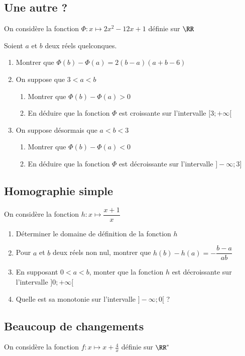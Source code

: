 \documentclass[oneside,12pt]{article}          %
\begin{document}
\subsection{Une autre ?}
On considère la fonction $\Phi:x\mapsto 2x^2-12x+1$ définie sur $\RR$

Soient $a$ et $b$ deux réels quelconques.
\begin{enumerate}
	\item Montrer que $\Phi(b)-\Phi(a)=2(b-a)(a+b-6)$
	\item On suppose que $3<a<b$
	\begin{enumerate}
		\item Montrer que $\Phi(b)-\Phi(a)>0$
		\item En déduire que la fonction $\Phi$ est croissante sur l'intervalle $[3;+\infty[$
	\end{enumerate}
	\item On suppose désormais que $a<b<3$
	\begin{enumerate}
		\item Montrer que $\Phi(b)-\Phi(a)<0$
		\item En déduire que la fonction $\Phi$ est décroissante sur l'intervalle $]-\infty;3]$
	\end{enumerate}
\end{enumerate}



\subsection{Homographie simple}
On considère la fonction $h:x\mapsto \dfrac{x+1}{x}$
\begin{enumerate}
	\item Déterminer le domaine de définition de la fonction $h$
	\item Pour $a$ et $b$ deux réels non nul, montrer que $h(b)-h(a)=-\dfrac{b-a}{ab}$
	\item En supposant $0<a<b$, monter que la fonction $h$ est décroissante sur l'intervalle $]0;+\infty[$
	\item Quelle est sa monotonie sur l'intervalle $]-\infty;0[$ ?
\end{enumerate}



\subsection{Beaucoup de changements}
On considère la fonction $f:x\mapsto x+\frac{4}{x}$ définie sur $\RR^*$
\end{document}
